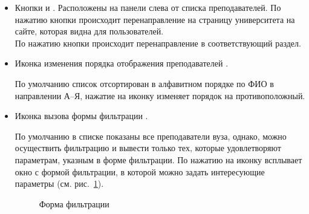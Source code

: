 \begin{itemize}
	\item Кнопки  и . Расположены на панели слева от списка преподавателей. По нажатию кнопки  происходит перенаправление на страницу университета на сайте, которая видна для пользователей. \\
	По нажатию кнопки  происходит перенаправление в соответствующий раздел.
	\item Иконка изменения порядка отображения преподавателей 	. 


По умолчанию список отсортирован в алфавитном порядке по ФИО в направлении А--Я, нажатие на иконку изменяет порядок на противоположный.
	\item Иконка вызова формы фильтрации .

 
По умолчанию в списке показаны все преподаватели вуза, однако, можно осуществить фильтрацию и вывести только тех, которые удовлетворяют параметрам, указным в форме фильтрации. По нажатию на иконку всплывает окно с формой фильтрации, в которой можно задать интересующие параметры (см. рис.~\ref{instructor:list_filter_form}). 

	\begin{figure}[H]
	\caption{Форма фильтрации}
	\label{instructor:list_filter_form}
	\end{figure}


\end{itemize}
